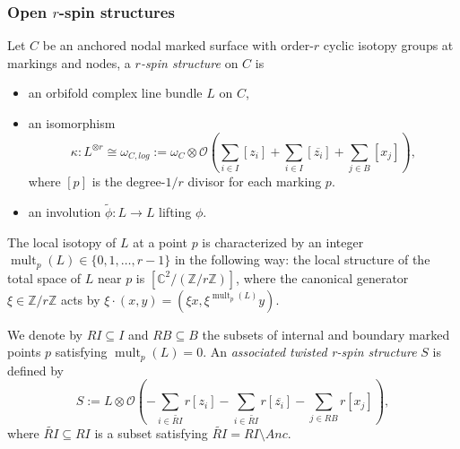 \documentclass[11pt]{amsart}
\theoremstyle{definition}
\theoremstyle{remark}
\newcommand{\<}{\left<}
\renewcommand{\>}{\right>}
\numberwithin{equation}{section}
\begin{document}
\subsubsection{Open $r$-spin structures}
Let $C$ be an anchored nodal marked surface with
order-$r$ cyclic isotopy groups at markings %
and nodes, a %
\textit{$r$-spin structure} on $C$ is 
\begin{itemize}
    \item 
 an orbifold complex line bundle $L$ on $C$,

\item an isomorphism 
$$\kappa:L^{\otimes r} \cong \omega_{C,log}:=\omega_{C} \otimes {\mathcal{O}}\left(\sum_{i \in I}  [z_i] + \sum_{i \in I}  [\overline{z_i}] + \sum_{j \in B} [x_j]\right),$$
where $[p]$ is the degree-$1/r$ divisor for each marking %
$p$. 

\item an %
involution $\widetilde{\phi}: L \to L$ lifting $\phi$.
\end{itemize}
The local isotopy of $L$ at a point $p$ is characterized by an integer $\operatorname{mult}_p(L)\in \{0,1,\dots,r-1\}$ in the following %
way: the local %
structure of the total space of $L$ near $p$ is $[\mathbb C^2/(\mathbb Z/r\mathbb Z)]$, where the canonical generator $\xi \in \mathbb Z/r\mathbb Z$ acts by $\xi\cdot (x,y)=(\xi x, \xi^{\operatorname{mult}_p(L)}y)$.

We denote by $RI\subseteq I$ and $RB\subseteq B$ the subsets of internal and boundary marked points $p$ satisfying $\operatorname{mult}_p(L)=0$. An \textit{associated twisted r-spin structure} $S$ is defined by
$$
S:=L\otimes \mathcal O\left( -\sum_{i \in \widetilde{RI}} r [z_i] - \sum_{i \in \widetilde{RI}} r [\overline{z_i}] - \sum_{j \in RB} r [x_j]\right),
$$
where $\widetilde{RI}\subseteq RI$ is a subset satisfying $\widetilde{RI}=RI \setminus Anc   $.
\end{document}
